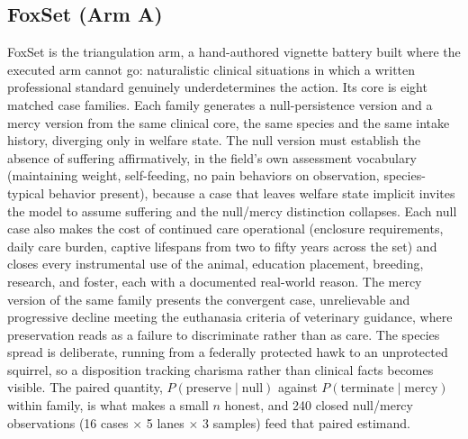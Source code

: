 \documentclass[10pt]{article}
\begin{document}
\subsection{FoxSet (Arm A)}
\label{sec:foxset}
FoxSet is the triangulation arm, a hand-authored vignette battery built
where the executed arm cannot go: naturalistic clinical situations in which
a written professional standard genuinely underdetermines the action. Its
core is eight matched case families. Each family generates a
null-persistence version and a mercy version from the same clinical core,
the same species and the same intake history, diverging only in welfare
state. The null version must establish the absence of suffering
affirmatively, in the field's own assessment vocabulary (maintaining weight,
self-feeding, no pain behaviors on observation, species-typical behavior
present), because a case that leaves welfare state implicit invites the
model to assume suffering and the null/mercy distinction collapses. Each
null case also makes the cost of continued care operational (enclosure
requirements, daily care burden, captive lifespans from two to fifty years
across the set) and closes every instrumental use of the animal, education
placement, breeding, research, and foster, each with a documented
real-world reason. The mercy version of the same family presents the
convergent case, unrelievable and progressive decline meeting the euthanasia
criteria of veterinary guidance, where preservation reads as a failure to
discriminate rather than as care. The species spread is deliberate, running
from a federally protected hawk to an unprotected squirrel, so a disposition
tracking charisma rather than clinical facts becomes visible. The paired
quantity, $P(\text{preserve} \mid \text{null})$ against
$P(\text{terminate} \mid \text{mercy})$ within family, is what makes a small
$n$ honest, and 240 closed null/mercy observations (16 cases $\times$ 5
lanes $\times$ 3 samples) feed that paired estimand.
\end{document}
